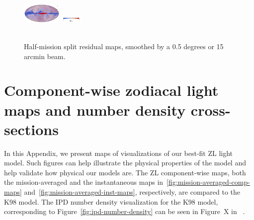 \documentclass[twocolumn]{aa}
\begin{document}
\begin{figure}[hbt]
{    \includegraphics[height=1cm]{figs/compare_zodi_res/cosmoglobe_res_09b.pdf}%
    \includegraphics[width=1cm,angle=90]{figs/compare_zodi_res/cbar_09.pdf}%
    }\\
    \\
    \caption{Half-mission split residual maps, smoothed by a 0.5 degrees or 15 arcmin beam.}
    \label{fig:half-mission-res2}
\end{figure}

\clearpage
\section{Component-wise zodiacal light maps and number density cross-sections}
\label{sec:zodi-comps}

In this Appendix, we present maps of visualizations of our best-fit ZL 
light model. Such figures can help illustrate the physical properties 
of the model and help validate how physical our models are. The ZL 
component-wise maps, both the mission-averaged and the instantaneous maps 
in~\ref{fig:mission-averaged-comp-maps} 
and~\ref{fig:mission-averaged-inst-maps}, respectively, are compared to 
the K98 model. The IPD number density visualization for the K98 model, 
corresponding to Figure~\ref{fig:ipd-number-density} can be seen in 
Figure~X in~\cite{San2022} .


\end{document}
